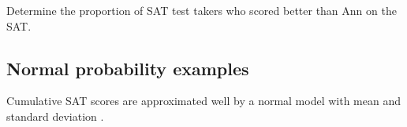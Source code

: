 \begin{exercisewrap}
\begin{nexercise}
Determine the proportion of SAT test takers who scored better than Ann on the SAT.\footnotemark
\end{nexercise}
\end{exercisewrap}

\subsection{Normal probability examples}

Cumulative SAT scores are approximated well by a normal model with mean \satmean{} and standard deviation \satsd{}.

